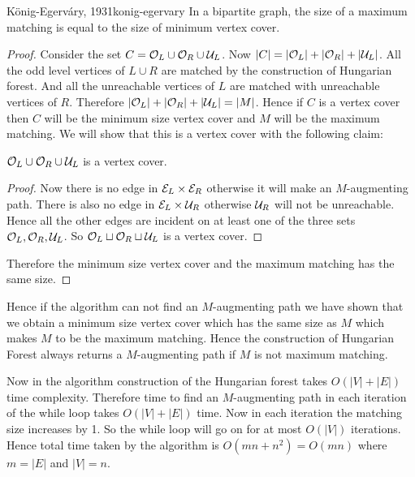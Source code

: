 \begin{Theorem}{K\"{o}nig-Egerv\'{a}ry, 1931}{konig-egervary}
	In a bipartite graph, the size of a maximum matching is equal to the size of minimum vertex cover.
\end{Theorem}
\begin{proof}
	Consider the set $C=\mathcal{O}_L\cup \mathcal{O}_R\cup \mathcal{U}_L$. Now $|C|=|\mathcal{O}_L|+|\mathcal{O}_R|+|\mathcal{U}_L|$. All the odd level vertices of $L\cup R$ are matched by the construction of Hungarian forest. And all the unreachable vertices of $L$ are matched with unreachable vertices of $R$. Therefore $|\mathcal{O}_L|+|\mathcal{O}_R|+|\mathcal{U}_L|=|M|$. Hence if $C$ is a vertex cover then $C$ will be the minimum size vertex cover and $M$ will be the maximum matching. We will show that this is a vertex cover with the following claim:
	\begin{claimwidth}
		\begin{claim}{}{}
			$\mathcal{O}_L\cup \mathcal{O}_R\cup \mathcal{U}_L$ is a vertex cover.
		\end{claim}
		\begin{proof}
			Now there is no edge in $\mathcal{E}_L\times \mathcal{E}_R$ otherwise it will make an $M$-augmenting path. There is also no edge in $\mathcal{E}_L\times \mathcal{U}_R$  otherwise $\mathcal{U}_R$ will not be unreachable. Hence all the other edges are incident on at least  one of the three sets $\mathcal{O}_L,\mathcal{O}_R,\mathcal{U}_L$. So $\mathcal{O}_L\sqcup \mathcal{O}_R\sqcup \mathcal{U}_L$ is a vertex cover. 
		\end{proof}
	\end{claimwidth}
	Therefore the minimum size vertex cover and the maximum matching has the same size.
\end{proof}

Hence if the algorithm can not find an $M$-augmenting path we have shown that we obtain a  minimum size vertex cover which has the same size as $M$ which makes $M$ to be the maximum matching. Hence the construction of Hungarian Forest always returns a $M$-augmenting path if $M$ is not maximum matching.

Now in the algorithm construction of the Hungarian forest takes $O(|V|+|E|)$ time complexity. Therefore time to find an $M$-augmenting path in each iteration of the while loop takes $O(|V|+|E|)$ time. Now in each iteration the matching size increases by 1. So the while loop will go on for at most $O(|V|)$ iterations. Hence total time taken by the algorithm is $O(mn+n^2)=O(mn)$ where $m=|E|$ and  $|V|=n$.

